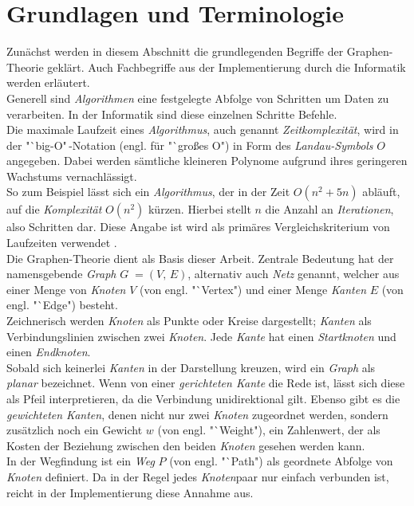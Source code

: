 \documentclass[12pt]{article}
\begin{document}
\section{Grundlagen und Terminologie}
\label{sec:basics}
Zunächst werden in diesem Abschnitt die grundlegenden Begriffe der Graphen-Theorie geklärt. Auch Fachbegriffe aus der Implementierung durch die Informatik werden erläutert.
\\
Generell sind \textit{Algorithmen} eine festgelegte Abfolge von Schritten um Daten zu verarbeiten. In der Informatik sind diese einzelnen Schritte Befehle.
\\
Die maximale Laufzeit eines \textit{Algorithmus}, auch genannt \textit{Zeitkomplexität}, wird in der "`big-O"\,-Notation (engl. für "`großes O") in Form des \textit{Landau-Symbols} $O$ angegeben. Dabei werden sämtliche kleineren Polynome aufgrund ihres geringeren Wachstums vernachlässigt. 
\\
So zum Beispiel lässt sich ein \textit{Algorithmus}, der in der Zeit $O(n^2+5n)$ abläuft, auf die \textit{Komplexität} $O(n^2)$ kürzen. Hierbei stellt $n$ die Anzahl an \textit{Iterationen}, also Schritten dar. Diese Angabe ist wird als primäres Vergleichskriterium von Laufzeiten verwendet \cite{big-o}.
\\
Die Graphen-Theorie dient als Basis dieser Arbeit. Zentrale Bedeutung hat der namensgebende \textit{Graph} $G\; = (V,\,E)$, alternativ auch \textit{Netz} genannt, welcher aus einer Menge von \textit{Knoten} $V$ (von engl. "`Vertex") und einer Menge \textit{Kanten} $E$ (von engl. "`Edge") besteht.
\\
Zeichnerisch werden \textit{Knoten} als Punkte oder Kreise dargestellt; \textit{Kanten} als Verbindungslinien zwischen zwei \textit{Knoten}. Jede \textit{Kante} hat einen \textit{Startknoten} und einen \textit{Endknoten}. 
\\
Sobald sich keinerlei \textit{Kanten} in der Darstellung kreuzen, wird ein \textit{Graph} als \textit{planar} bezeichnet. Wenn von einer \textit{gerichteten Kante} die Rede ist, lässt sich diese als Pfeil interpretieren, da die Verbindung unidirektional gilt. Ebenso gibt es die \textit{gewichteten Kanten}, denen nicht nur zwei \textit{Knoten} zugeordnet werden, sondern zusätzlich noch ein Gewicht $w$ (von engl. "`Weight"), ein Zahlenwert, der als Kosten der Beziehung zwischen den beiden \textit{Knoten} gesehen werden kann.
\\
In der Wegfindung ist ein \textit{Weg} $P$ (von engl. "`Path") als geordnete Abfolge von \textit{Knoten} definiert. Da in der Regel jedes \textit{Knoten}paar nur einfach verbunden ist, reicht in der Implementierung diese Annahme aus.
\end{document}
